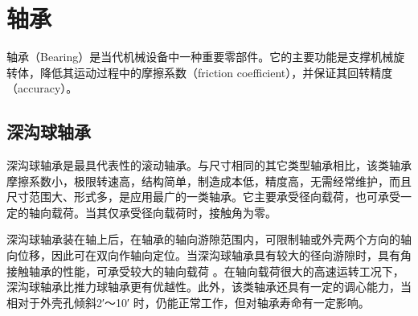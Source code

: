 \documentclass[UTF8]{article} %
\begin{document}
\section{轴承}
轴承（Bearing）是当代机械设备中一种重要零部件。它的主要功能是支撑机械旋转体，降低其运动过程中的摩擦系数（friction coefficient），并保证其回转精度（accuracy）。

\subsection{深沟球轴承}

深沟球轴承是最具代表性的滚动轴承。与尺寸相同的其它类型轴承相比，该类轴承摩擦系数小，极限转速高，结构简单，制造成本低，精度高，无需经常维护，而且尺寸范围大、形式多，是应用最广的一类轴承。它主要承受径向载荷，也可承受一定的轴向载荷。当其仅承受径向载荷时，接触角为零。

深沟球轴承装在轴上后，在轴承的轴向游隙范围内，可限制轴或外壳两个方向的轴向位移，因此可在双向作轴向定位。当深沟球轴承具有较大的径向游隙时，具有角接触轴承的性能，可承受较大的轴向载荷 。在轴向载荷很大的高速运转工况下，深沟球轴承比推力球轴承更有优越性。此外，该类轴承还具有一定的调心能力，当相对于外壳孔倾斜2′～10′ 时，仍能正常工作，但对轴承寿命有一定影响。
\end{document}
